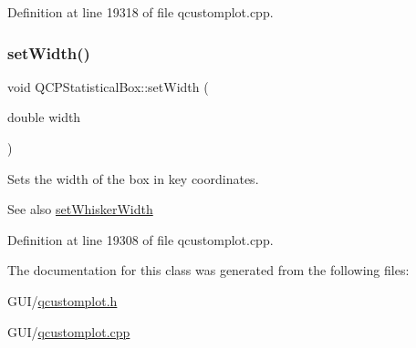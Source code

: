 Definition at line 19318 of file qcustomplot.\+cpp.

\mbox{\label{class_q_c_p_statistical_box_a0b62775bd67301b1eba5c785f2b26f14}} 
\subsubsection{\texorpdfstring{set\+Width()}{setWidth()}}
{\footnotesize\ttfamily void Q\+C\+P\+Statistical\+Box\+::set\+Width (\begin{DoxyParamCaption}\item[{double}]{width }\end{DoxyParamCaption})}

Sets the width of the box in key coordinates.

\begin{DoxySeeAlso}{See also}
\hyperlink{class_q_c_p_statistical_box_adf378812446bd66f34d1f7f293d991cd}{set\+Whisker\+Width} 
\end{DoxySeeAlso}


Definition at line 19308 of file qcustomplot.\+cpp.



The documentation for this class was generated from the following files\+:\begin{DoxyCompactItemize}
\item 
G\+U\+I/\hyperlink{qcustomplot_8h}{qcustomplot.\+h}\item 
G\+U\+I/\hyperlink{qcustomplot_8cpp}{qcustomplot.\+cpp}\end{DoxyCompactItemize}
